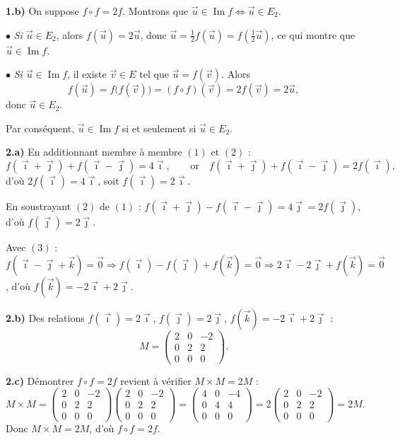 \smallskip
\noindent\textbf{1.b)} On suppose $f\circ f=2f$. Montrons que $\vec u\in\operatorname{Im}f\iff\vec u\in E_2$.

$\bullet$ \emph{Si $\vec u\in E_2$}, alors $f(\vec u)=2\vec u$, donc $\vec u=\frac12 f(\vec u)=f\!\left(\frac12\vec u\right)$,
ce qui montre que $\vec u\in\operatorname{Im}f$.

$\bullet$ \emph{Si $\vec u\in\operatorname{Im}f$}, il existe $\vec v\in E$ tel que $\vec u=f(\vec v)$. Alors
\[ f(\vec u)=f\big(f(\vec v)\big)=(f\circ f)(\vec v)=2f(\vec v)=2\vec u, \]
donc $\vec u\in E_2$.

Par conséquent, $\vec u\in\operatorname{Im}f$ si et seulement si $\vec u\in E_2$.

\smallskip
\noindent\textbf{2.a)} En additionnant membre à membre $(1)$ et $(2)$ :
\[ f(\vec\imath+\vec\jmath)+f(\vec\imath-\vec\jmath)=4\vec\imath,\qquad\text{or}\quad f(\vec\imath+\vec\jmath)+f(\vec\imath-\vec\jmath)=2f(\vec\imath), \]
d'où $2f(\vec\imath)=4\vec\imath$, soit $f(\vec\imath)=2\vec\imath$.

En soustrayant $(2)$ de $(1)$ : $f(\vec\imath+\vec\jmath)-f(\vec\imath-\vec\jmath)=4\vec\jmath=2f(\vec\jmath)$, d'où $f(\vec\jmath)=2\vec\jmath$.

Avec $(3)$ : $f(\vec\imath-\vec\jmath+\vec k)=\vec0\Rightarrow f(\vec\imath)-f(\vec\jmath)+f(\vec k)=\vec0\Rightarrow 2\vec\imath-2\vec\jmath+f(\vec k)=\vec0$,
d'où $f(\vec k)=-2\vec\imath+2\vec\jmath$.

\smallskip
\noindent\textbf{2.b)} Des relations $f(\vec\imath)=2\vec\imath$, $f(\vec\jmath)=2\vec\jmath$, $f(\vec k)=-2\vec\imath+2\vec\jmath$ :
\[ M=\begin{pmatrix}2&0&-2\\0&2&2\\0&0&0\end{pmatrix}. \]

\smallskip
\noindent\textbf{2.c)} Démontrer $f\circ f=2f$ revient à vérifier $M\times M=2M$ :
\[ M\times M=\begin{pmatrix}2&0&-2\\0&2&2\\0&0&0\end{pmatrix}\begin{pmatrix}2&0&-2\\0&2&2\\0&0&0\end{pmatrix}
=\begin{pmatrix}4&0&-4\\0&4&4\\0&0&0\end{pmatrix}=2\begin{pmatrix}2&0&-2\\0&2&2\\0&0&0\end{pmatrix}=2M. \]
Donc $M\times M=2M$, d'où $f\circ f=2f$.

